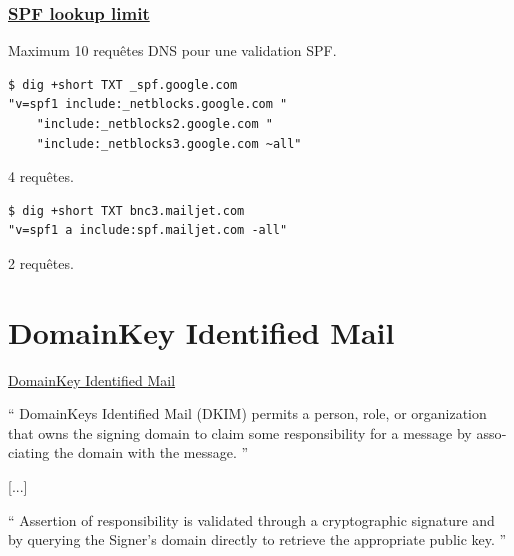 \documentclass{beamer}
\begin{document}
\begin{frame}[fragile]
    \frametitle{\href{https://www.mailhardener.com/blog/spf-lookup-limit-explained\#the-lookup-limit}{SPF lookup limit}}

    Maximum 10 requêtes DNS pour une validation SPF.

    \begin{verbatim}
$ dig +short TXT _spf.google.com
"v=spf1 include:_netblocks.google.com "
    "include:_netblocks2.google.com "
    "include:_netblocks3.google.com ~all"
    \end{verbatim}

    \pause

    4 requêtes.

    \begin{verbatim}
$ dig +short TXT bnc3.mailjet.com
"v=spf1 a include:spf.mailjet.com -all"
    \end{verbatim}

    \pause

    2 requêtes.
\end{frame}


\section{DomainKey Identified Mail}

\begin{frame}{\href{https://datatracker.ietf.org/doc/html/rfc6376}{DomainKey Identified Mail}}

    \foreignquote{english}{
        DomainKeys Identified Mail (DKIM) permits a person, role, or
        organization that owns the signing domain to claim some
        responsibility for a message by associating the domain with the
        message.
    }

    \vspace{0.2cm}
    [...]
    \vspace{0.2cm}

    \foreignquote{english}{
        Assertion of responsibility is validated through a cryptographic
        signature and by querying the Signer's domain directly to retrieve the
        appropriate public key.
    }
\end{frame}
\end{document}
